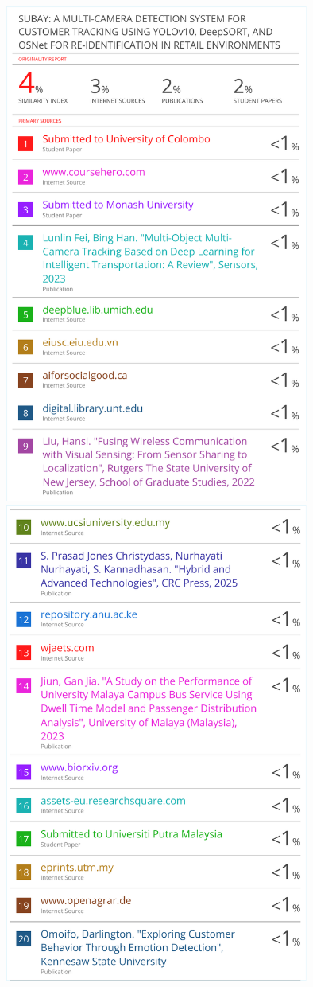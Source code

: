 \begin{center}
	\centering
	\includegraphics[width=0.75\textwidth]{app/J1.pdf}
	\includegraphics[width=0.75\textwidth]{app/J2.pdf}

\end{center}
